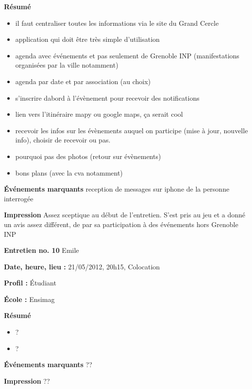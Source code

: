 \documentclass[a4paper, 11px]{article}
\begin{document}
\textbf{Résumé}
	\begin{itemize}
		\item il faut centraliser toutes les informations via le site du Grand Cercle
		\item application qui doit être très simple d'utilisation
		\item agenda avec événements et pas seulement de Grenoble INP (manifestations organisées par la ville notamment)
		\item agenda par date et par association (au choix)
		\item s’inscrire dabord à l’évènement pour recevoir des notifications
		\item lien vers l’itinéraire mapy ou google maps, ça serait cool
		\item recevoir les infos sur les évènements auquel on participe (mise à jour, nouvelle
     info), choisir de recevoir ou pas.
		\item pourquoi pas des photos (retour sur évènements)
		\item bons plans (avec la cva notamment)

	\end{itemize}

\textbf{Événements marquants}
reception de messages sur iphone de la personne interrogée

\textbf{Impression}
Assez sceptique au début de l'entretien. S'est pris au jeu et a donné un avis assez différent, de par sa participation à des événements hors Grenoble INP



\vspace{.3cm}

 \textbf {\large Entretien no. 10}
Emile

\textbf{Date, heure, lieu : }
21/05/2012, 20h15, Colocation

\textbf{Profil : }
Étudiant

\textbf{École : }
Ensimag

\textbf{Résumé}
	\begin{itemize}
		\item ?
		\item ?
	\end{itemize}

\textbf{Événements marquants}
??

\textbf{Impression}
??


\vspace{.3cm}
\end{document}
